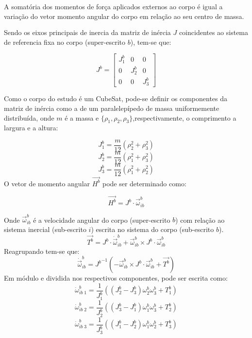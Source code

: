 A somatória dos momentos de força aplicados externos ao corpo é igual a variação do vetor momento angular do corpo em relação ao seu centro de massa.

Sendo os eixos principais de inercia da matriz de inércia  $J$ coincidentes ao sistema de referencia fixa no corpo (super-escrito $b$), tem-se que:

\begin{equation}J^b =\begin{bmatrix}
J^b_1&0&0 \\0 &J^b_2&0 \\ 0&0&J^b_3
\end{bmatrix}\end{equation}

Como o corpo do estudo é um CubeSat, pode-se definir os componentes da matriz de inércia como a de um paralelepípedo de massa uniformemente distribuída, onde $m$ é a massa e $\{\rho_1,\rho_2,\rho_3\}$,respectivamente, o comprimento a largura e a altura:

\begin{equation}
J^b_1=\frac{m}{12}(\rho_2 ^2+\rho_3^2)\end{equation}
\begin{equation}J^b_2=\frac{m}{12}(\rho_1 ^2+\rho_3^2)\end{equation}
\begin{equation}J^b_3=\frac{m}{12}(\rho_1 ^2+\rho_2^2)
\end{equation}
O vetor de momento angular $\vec{H^b}$ pode ser determinado como:

\begin{equation}\vec{H^b}=J^b\cdot\vec{\omega}^b_{ib}\end{equation}

Onde  $\vec{\omega}^b_{ib}$ é a velocidade angular do corpo (super-escrito $b$)  com relação ao sistema inercial (sub-escrito $i$) escrita no sistema do corpo (sub-escrito $b$). 
\begin{equation}
\vec{T^b}=J^b\cdot\dot{\vec{\omega}}^b_{ib} +\vec{\omega}^b_{ib}\times J^b\cdot\vec{\omega}^b_{ib}
\end{equation}Reagrupando tem-se que:
\begin{equation}\dot{\vec{\omega}}^b_{ib}={J^b}^{-1}(-\vec{\omega}^b_{ib}\times J^b\cdot\vec{\omega}^b_{ib}+\vec{T^b})\end{equation}
Em módulo e dividida nos respectivos componentes, pode ser escrita como:
\begin{equation}\dot{\omega}_{ib\;1}^b=\frac{1}{J^b_1}((J^b_2-J^b_3)\omega_2^b\omega_3^b+T^b_1)\end{equation}
\begin{equation}\dot{\omega}_{ib\;2}^b=\frac{1}{J^b_2}((J^b_3-J^b_1)\omega_1^b\omega_3^b+T^b_2)\end{equation}
\begin{equation}\dot{\omega}_{ib\;3}^b=\frac{1}{J^b_3}((J^b_1-J^b_2)\omega_1^b\omega_2^b+T^b_3)\end{equation}

